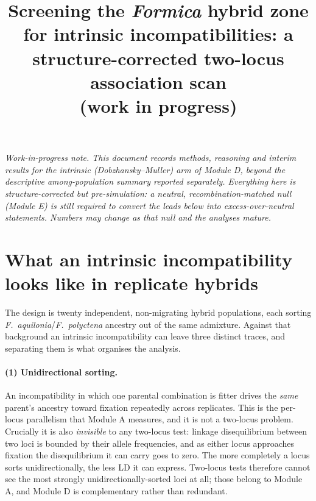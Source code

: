 \documentclass[11pt]{article}
\title{\vspace{-3em}Screening the \textit{Formica} hybrid zone for intrinsic
incompatibilities: a structure-corrected two-locus
association scan\\[0.3em]\large(work in progress)}
\author{}
\date{}
\newcommand{\Faq}{\textit{F.~aquilonia}}
\newcommand{\Fpo}{\textit{F.~polyctena}}
\begin{document}
\maketitle
\vspace{-3.5em}

\noindent\textit{Work-in-progress note. This document records methods, reasoning
and interim results for the intrinsic (Dobzhansky--Muller) arm of Module D, beyond
the descriptive among-population summary reported separately. Everything here is
structure-corrected but pre-simulation: a neutral, recombination-matched null
(Module E) is still required to convert the leads below into excess-over-neutral
statements. Numbers may change as that null and the analyses mature.}

\section{What an intrinsic incompatibility looks like in replicate hybrids}

The design is twenty independent, non-migrating hybrid populations, each sorting
\Faq/\Fpo{} ancestry out of the same admixture. Against that background an intrinsic
incompatibility can leave three distinct traces, and separating them is what
organises the analysis.

\paragraph{(1) Unidirectional sorting.} An incompatibility in which one parental
combination is fitter drives the \emph{same} parent's ancestry toward fixation
repeatedly across replicates. This is the per-locus parallelism that Module A
measures, and it is not a two-locus problem. Crucially it is also \emph{invisible}
to any two-locus test: linkage disequilibrium between two loci is bounded by their
allele frequencies, and as either locus approaches fixation the disequilibrium it
can carry goes to zero. The more completely a locus sorts unidirectionally, the less
LD it can express. Two-locus tests therefore cannot see the most strongly
unidirectionally-sorted loci at all; those belong to Module A, and Module D is
complementary rather than redundant.
\end{document}
